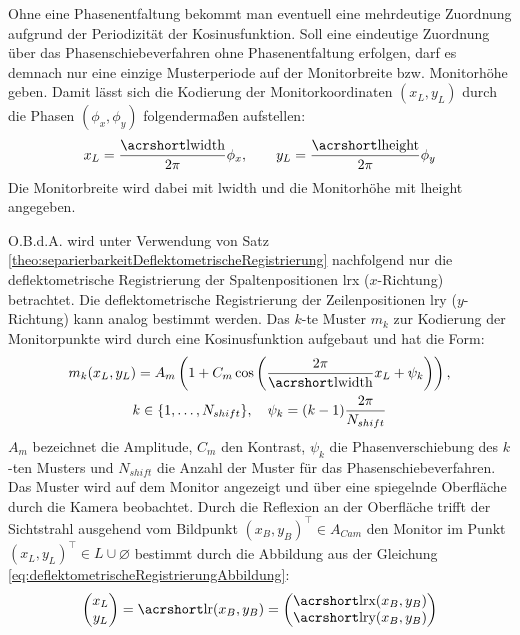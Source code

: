 Ohne eine Phasenentfaltung bekommt man eventuell eine mehrdeutige Zuordnung aufgrund der Periodizität der Kosinusfunktion.
Soll eine eindeutige Zuordnung über das Phasenschiebeverfahren ohne Phasenentfaltung erfolgen, darf es demnach nur eine einzige Musterperiode auf der Monitorbreite bzw. Monitorhöhe geben.
Damit lässt sich die Kodierung der Monitorkoordinaten $(x_{L}, y_{L})$ durch die Phasen $(\phi_{x}, \phi_{y})$ folgendermaßen aufstellen:
\begin{equation}\label{eq:phasenkodierung}
	x_{L} = \dfrac{\acrshortmath{lwidth}}{2\pi}\phi_{x},
	\qquad
	y_{L} = \dfrac{\acrshortmath{lheight}}{2\pi}\phi_{y}
\end{equation}
%
\noindent
Die Monitorbreite wird dabei mit \acrshort{lwidth} und die Monitorhöhe mit \acrshort{lheight} angegeben.

\p
O.B.d.A. wird unter Verwendung von Satz \ref{theo:separierbarkeitDeflektometrischeRegistrierung} nachfolgend nur die deflektometrische Registrierung der Spaltenpositionen \acrshort{lrx} ($x$-Richtung) betrachtet.
Die deflektometrische Registrierung der Zeilenpositionen \acrshort{lry} ($y$-Richtung) kann analog bestimmt werden.
Das $k$-te Muster $m_k$ zur Kodierung der Monitorpunkte wird durch eine Kosinusfunktion aufgebaut und hat die Form:
%
\begin{equation}\label{eq:monitormuster}
	\begin{gathered}	
		m_k(x_L,y_L) = A_m \left(1 + C_m \cos \left(\dfrac{2\pi}{\acrshortmath{lwidth}} x_L + \psi_k\right)\right),\\
		k \in \lbrace 1,\ldots,N_{shift}\rbrace,
		\quad
		\psi_k = (k - 1)\dfrac{2\pi}{N_{shift}}
	\end{gathered}
\end{equation}
%
$A_m$ bezeichnet die Amplitude, $C_m$ den Kontrast, $\psi_k$ die Phasenverschiebung des $k$-ten Musters und $N_{shift}$ die Anzahl der Muster für das Phasenschiebeverfahren.
Das Muster wird auf dem Monitor angezeigt und über eine spiegelnde Oberfläche durch die Kamera beobachtet.
Durch die Reflexion an der Oberfläche trifft der Sichtstrahl ausgehend vom Bildpunkt $(x_B, y_B)^\top \in A_{Cam}$ den Monitor im Punkt $(x_L, y_L)^\top \in L \cup \varnothing$ bestimmt durch die Abbildung aus der Gleichung \ref{eq:deflektometrischeRegistrierungAbbildung}:
%
\begin{equation}
	\begin{pmatrix}
		x_L \\ 
		y_L
	\end{pmatrix}
	= \acrshortmath{lr}(x_B, y_B) = 
	\begin{pmatrix}
		\acrshortmath{lrx}(x_B, y_B) \\ 
		\acrshortmath{lry}(x_B, y_B)
	\end{pmatrix} 
\end{equation}
